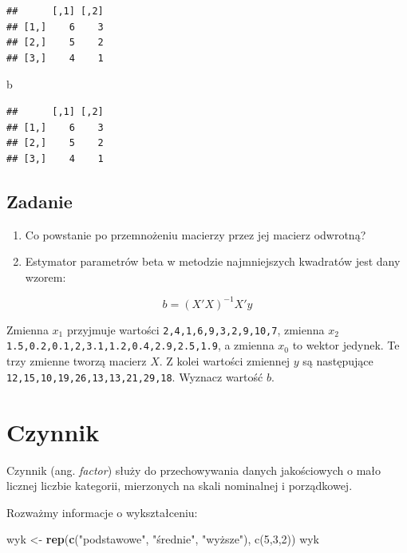 \documentclass[]{book}
\newenvironment{Shaded}{\begin{snugshade}}{\end{snugshade}}
\newcommand{\KeywordTok}[1]{\textcolor[rgb]{0.13,0.29,0.53}{\textbf{#1}}}
\newcommand{\StringTok}[1]{\textcolor[rgb]{0.31,0.60,0.02}{#1}}
\newcommand{\NormalTok}[1]{#1}
\providecommand{\tightlist}{%
  \setlength{\itemsep}{0pt}\setlength{\parskip}{0pt}}
\begin{document}
\begin{verbatim}
##      [,1] [,2]
## [1,]    6    3
## [2,]    5    2
## [3,]    4    1
\end{verbatim}

\begin{Shaded}
\begin{Highlighting}[]
\NormalTok{b}
\end{Highlighting}
\end{Shaded}

\begin{verbatim}
##      [,1] [,2]
## [1,]    6    3
## [2,]    5    2
## [3,]    4    1
\end{verbatim}

\subsection{Zadanie}\label{zadanie}

\begin{enumerate}
\def\labelenumi{\arabic{enumi}.}
\tightlist
\item
  Co powstanie po przemnożeniu macierzy przez jej macierz odwrotną?
\item
  Estymator parametrów beta w metodzie najmniejszych kwadratów jest dany
  wzorem:
\end{enumerate}

\[b=(X'X)^{-1}X'y\]

Zmienna \(x_1\) przyjmuje wartości \texttt{2,4,1,6,9,3,2,9,10,7},
zmienna \(x_2\) \texttt{1.5,0.2,0.1,2,3.1,1.2,0.4,2.9,2.5,1.9}, a
zmienna \(x_0\) to wektor jedynek. Te trzy zmienne tworzą macierz \(X\).
Z kolei wartości zmiennej \(y\) są następujące
\texttt{12,15,10,19,26,13,13,21,29,18}. Wyznacz wartość \(b\).

\section{Czynnik}\label{czynnik}

Czynnik (ang. \emph{factor}) służy do przechowywania danych jakościowych
o mało licznej liczbie kategorii, mierzonych na skali nominalnej i
porządkowej.

Rozważmy informacje o wykształceniu:

\begin{Shaded}
\begin{Highlighting}[]
\NormalTok{wyk <-}\StringTok{ }\KeywordTok{rep}\NormalTok{(}\KeywordTok{c}\NormalTok{(}\StringTok{"podstawowe"}\NormalTok{, }\StringTok{"średnie"}\NormalTok{, }\StringTok{"wyższe"), c(5,3,2))}
\StringTok{wyk}
\end{Highlighting}
\end{Shaded}
\end{document}
